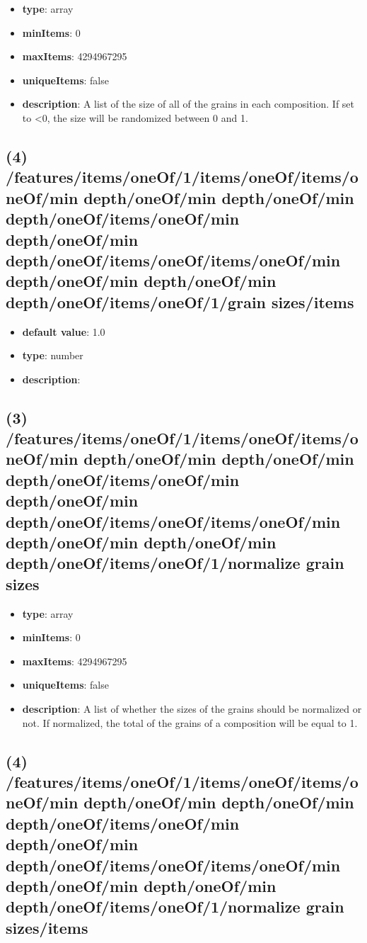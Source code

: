 \begin{itemize}[leftmargin=3em]\item {\bf type}: array
\item {\bf minItems}: 0
\item {\bf maxItems}: 4294967295
\item {\bf uniqueItems}: false
\item {\bf description}: A list of the size of all of the grains in each composition. If set to <0, the size will be randomized between 0 and 1.
\end{itemize}\subsection{(4) /features/items/oneOf/1/items/oneOf/items/oneOf/min depth/oneOf/min depth/oneOf/min depth/oneOf/items/oneOf/min depth/oneOf/min depth/oneOf/items/oneOf/items/oneOf/min depth/oneOf/min depth/oneOf/min depth/oneOf/items/oneOf/1/grain sizes/items}
\begin{itemize}[leftmargin=4em]\item {\bf default value}: 1.0
\item {\bf type}: number
\item {\bf description}: 
\end{itemize}\subsection{(3) /features/items/oneOf/1/items/oneOf/items/oneOf/min depth/oneOf/min depth/oneOf/min depth/oneOf/items/oneOf/min depth/oneOf/min depth/oneOf/items/oneOf/items/oneOf/min depth/oneOf/min depth/oneOf/min depth/oneOf/items/oneOf/1/normalize grain sizes}
\begin{itemize}[leftmargin=3em]\item {\bf type}: array
\item {\bf minItems}: 0
\item {\bf maxItems}: 4294967295
\item {\bf uniqueItems}: false
\item {\bf description}: A list of whether the sizes of the grains should be normalized or not. If normalized, the total of the grains of a composition will be equal to 1.
\end{itemize}\subsection{(4) /features/items/oneOf/1/items/oneOf/items/oneOf/min depth/oneOf/min depth/oneOf/min depth/oneOf/items/oneOf/min depth/oneOf/min depth/oneOf/items/oneOf/items/oneOf/min depth/oneOf/min depth/oneOf/min depth/oneOf/items/oneOf/1/normalize grain sizes/items}
